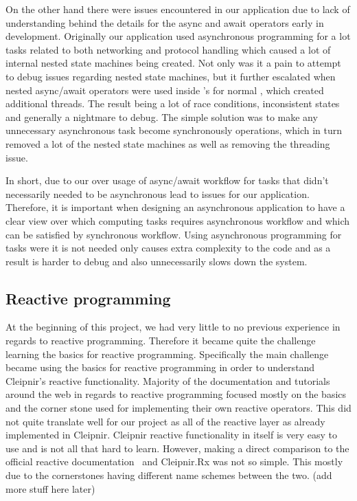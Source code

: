 On the other hand there were issues encountered in our application due to lack of understanding behind the details for the async and await operators early in development. Originally our application used asynchronous programming for a lot tasks related to both networking and protocol handling which caused a lot of internal nested state machines being created. Not only was it a pain to attempt to debug issues regarding nested state machines, but it further escalated when nested async/await operators were used inside 's for normal , which created additional threads. The result being a lot of race conditions, inconsistent states and generally a nightmare to debug. The simple solution was to make any unnecessary asynchronous task become synchronously operations, which in turn removed a lot of the nested state machines as well as removing the  threading issue.

In short, due to our over usage of async/await workflow for tasks that didn't necessarily needed to be asynchronous lead to issues for our application. Therefore, it is important when designing an asynchronous application to have a clear view over which computing tasks requires asynchronous workflow and which can be satisfied by synchronous workflow. Using asynchronous programming for tasks were it is not needed only causes extra complexity to the code and as a result is harder to debug and also unnecessarily slows down the system.

\subsection{Reactive programming}
At the beginning of this project, we had very little to no previous experience in regards to reactive programming. Therefore it became quite the challenge learning the basics for reactive programming. Specifically the main challenge became using the basics for reactive programming in order to understand Cleipnir's reactive functionality. Majority of the documentation and tutorials around the web in regards to reactive programming focused mostly on the basics and the corner stone used for implementing their own reactive operators. This did not quite translate well for our project as all of the reactive layer as already implemented in Cleipnir. Cleipnir reactive functionality in itself is very easy to use and is not all that hard to learn. However, making a direct comparison to the official reactive documentation~\cite{WEB:ReactiveXMainPage} and Cleipnir.Rx was not so simple. This mostly due to the cornerstones having different name schemes between the two. (add more stuff here later)

